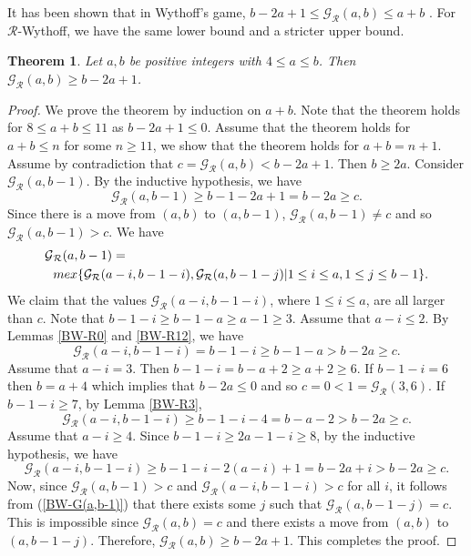 \documentclass[12pt]{amsart}
\theoremstyle{plain}
\newtheorem{theorem}[proposition]{Theorem}
\theoremstyle{definition}
\theoremstyle{remark}
\begin{document}
It has been shown that in Wythoff's game, $b-2a+1 \leq {\mathcal{G}}_{\mathcal{R}}(a,b) \leq a+b$ \cite{blass, landman}. For ${\mathcal{R}}$-Wythoff, we have the same lower bound and a stricter upper bound.

\smallskip
\begin{theorem} \label{BW-lower}
Let $a, b$ be positive integers with $4 \leq a \leq b$. Then ${\mathcal{G}}_{\mathcal{R}}(a,b) \geq b-2a+1$.
\end{theorem}

\begin{proof}
We prove the theorem by induction on $a+b$. Note that the theorem holds for $8 \leq a+b \leq 11$ as $b-2a+1 \leq 0$. Assume that the theorem holds for $a+b \leq n$ for some $n \geq 11$, we show that the theorem holds for $a+b = n+1$. Assume by contradiction that $c = {\mathcal{G}}_{\mathcal{R}}(a,b) < b-2a+1$. Then $b \geq 2a$.  Consider ${\mathcal{G}}_{\mathcal{R}}(a,b-1)$. By the inductive hypothesis, we have
\[{\mathcal{G}}_{\mathcal{R}}(a,b-1) \geq b-1-2a+1 = b-2a \geq c.\]
Since there is a move from $(a,b)$ to $(a,b-1)$, ${\mathcal{G}}_{\mathcal{R}}(a,b-1) \neq c$ and so ${\mathcal{G}}_{\mathcal{R}}(a,b-1) > c$. We have \begin{align} \label{BW-G(a,b-1)}
{\mathcal{G}}&_{\mathcal{R}}(a,b-1) =  \notag \\
  &mex\{{\mathcal{G}}_{\mathcal{R}}(a-i,b-1-i), {\mathcal{G}}_{\mathcal{R}}(a,b-1-j) | 1 \leq i \leq a, 1\leq j \leq b-1\}.
\end{align}
We claim that the values ${\mathcal{G}}_{\mathcal{R}}(a-i,b-1-i)$, where $1 \leq i \leq a$, are all larger than $c$. Note that $b-1-i \geq b-1-a \geq a-1 \geq 3$. Assume that $a-i \leq 2$. By Lemmas \ref{BW-R0} and \ref{BW-R12}, we have
\[{\mathcal{G}}_{\mathcal{R}}(a-i,b-1-i) = b-1-i \geq b-1-a > b-2a \geq c.\]
Assume that $a - i = 3$. Then $b-1-i = b-a+2 \geq a+2 \geq 6$. If $b-1-i = 6$ then $b = a+4$ which implies that $b-2a \leq 0$ and so $c = 0 < 1 = {\mathcal{G}}_{\mathcal{R}}(3,6)$. If $b-1-i \geq 7$, by Lemma \ref{BW-R3},
\[{\mathcal{G}}_{\mathcal{R}}(a-i,b-1-i) \geq b-1-i-4 = b-a-2 > b-2a \geq c.\]
Assume that $a-i \geq 4$. Since $b-1-i \geq 2a-1-i \geq 8$, by the inductive hypothesis, we have
\[{\mathcal{G}}_{\mathcal{R}}(a-i,b-1-i) \geq b-1-i - 2(a-i)+1 = b-2a+i > b-2a \geq c.\]
Now, since ${\mathcal{G}}_{\mathcal{R}}(a,b-1) > c$ and ${\mathcal{G}}_{\mathcal{R}}(a-i,b-1-i) > c$ for all $i$, it follows from (\ref{BW-G(a,b-1)}) that there exists some $j$ such that ${\mathcal{G}}_{\mathcal{R}}(a,b-1-j) = c$. This is impossible since ${\mathcal{G}}_{\mathcal{R}}(a,b) = c$ and there exists a move from $(a,b)$ to $(a,b-1-j)$. Therefore, ${\mathcal{G}}_{\mathcal{R}}(a,b) \geq b-2a+1$. This completes the proof.
\end{proof}
\end{document}
